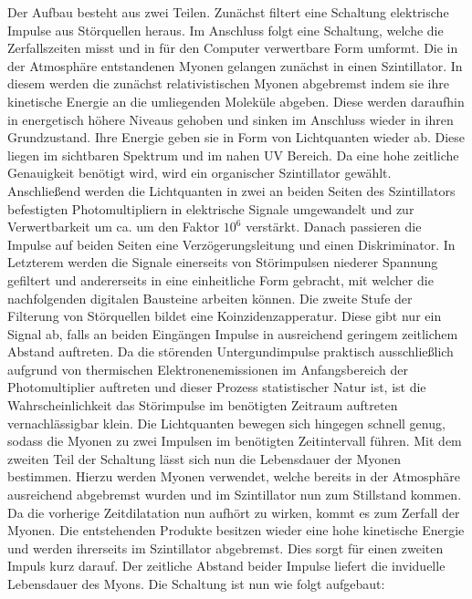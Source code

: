     Der Aufbau besteht aus zwei Teilen. Zunächst filtert eine Schaltung elektrische Impulse aus Störquellen heraus. Im Anschluss folgt eine Schaltung, welche die Zerfallszeiten misst und in für den Computer verwertbare Form umformt. Die in der Atmosphäre entstandenen Myonen gelangen zunächst in einen Szintillator. In diesem werden die zunächst relativistischen  Myonen abgebremst indem sie ihre kinetische Energie an die umliegenden Moleküle abgeben. Diese werden daraufhin in energetisch höhere Niveaus gehoben und sinken im Anschluss wieder in ihren Grundzustand. Ihre Energie geben sie in Form von Lichtquanten wieder ab. Diese liegen im sichtbaren Spektrum und im nahen UV Bereich. Da eine hohe zeitliche Genauigkeit benötigt wird, wird ein organischer Szintillator gewählt. Anschließend werden die Lichtquanten in zwei an beiden Seiten des Szintillators befestigten Photomultipliern in elektrische Signale umgewandelt und zur Verwertbarkeit um ca. um den Faktor $10^6$ verstärkt. Danach passieren die Impulse auf beiden Seiten eine Verzögerungsleitung und einen Diskriminator. In Letzterem werden die Signale einerseits von Störimpulsen niederer Spannung gefiltert und andererseits in eine einheitliche Form gebracht, mit welcher die nachfolgenden digitalen Bausteine arbeiten können. Die zweite Stufe der Filterung von Störquellen bildet eine Koinzidenzapperatur. Diese gibt nur ein Signal ab, falls an beiden Eingängen Impulse in ausreichend geringem zeitlichem Abstand auftreten. Da die störenden Untergundimpulse praktisch ausschließlich aufgrund von thermischen Elektronenemissionen im Anfangsbereich der Photomultiplier auftreten und dieser Prozess statistischer Natur ist, ist die Wahrscheinlichkeit das Störimpulse im benötigten Zeitraum auftreten vernachlässigbar klein. Die Lichtquanten bewegen sich hingegen schnell genug, sodass die Myonen zu zwei Impulsen im benötigten Zeitintervall führen.
    Mit dem zweiten Teil der Schaltung lässt sich nun die Lebensdauer der Myonen bestimmen. Hierzu werden Myonen verwendet, welche bereits in der Atmosphäre ausreichend abgebremst wurden und im Szintillator nun zum Stillstand kommen. Da die vorherige Zeitdilatation nun aufhört zu wirken, kommt es zum Zerfall der Myonen. Die entstehenden Produkte besitzen wieder eine hohe kinetische Energie und werden ihrerseits im Szintillator abgebremst. Dies sorgt für einen zweiten Impuls kurz darauf. Der zeitliche Abstand beider Impulse liefert die inviduelle Lebensdauer des Myons. Die Schaltung ist nun wie folgt aufgebaut:
